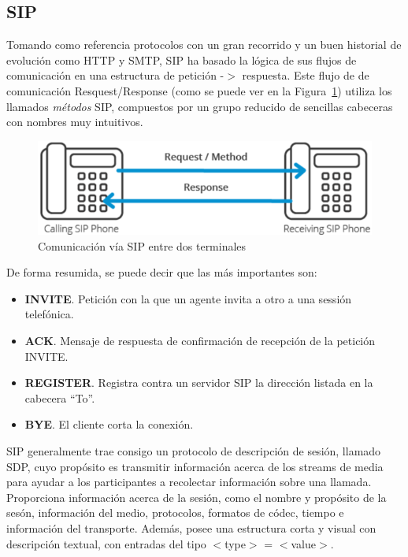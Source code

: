 \documentclass[a4paper, 12pt]{book}
\begin{document}
\subsection{SIP}
\label{sec:sip}

Tomando como referencia protocolos con un gran recorrido y un buen historial de evolución como HTTP y SMTP, SIP ha basado la lógica de sus flujos de comunicación en una estructura de petición -$>$ respuesta. Este flujo de de comunicación Resquest/Response (como se puede ver en la Figura~\ref{figura:fig_phones}) utiliza los llamados \emph{métodos} SIP, compuestos por un grupo reducido de sencillas cabeceras con nombres muy intuitivos.

\begin{figure}[h]
  \centering
  \includegraphics{img/fig_phones}
  \caption{Comunicación vía SIP entre dos terminales}
  \label{figura:fig_phones}
\end{figure}

De forma resumida, se puede decir que las más importantes son:
\begin{itemize}
  \item \textbf{INVITE}. Petición con la que un agente invita a otro a una sessión telefónica.
  \item \textbf{ACK}. Mensaje de respuesta de confirmación de recepción de la petición INVITE.
  \item \textbf{REGISTER}. Registra contra un servidor SIP la dirección listada en la cabecera ``To''.
  \item \textbf{BYE}. El cliente corta la conexión.\\
\end{itemize}

SIP generalmente trae consigo un protocolo de descripción de sesión, llamado SDP, cuyo propósito es transmitir información acerca de los streams de media para ayudar a los participantes a recolectar información sobre una llamada. Proporciona información acerca de la sesión, como el nombre y propósito de la sesón, información del medio, protocolos, formatos de códec, tiempo e información del transporte. Además, posee una estructura corta y visual con descripción textual, con entradas del tipo $<$type$>$ = $<$value$>$.
\end{document}
